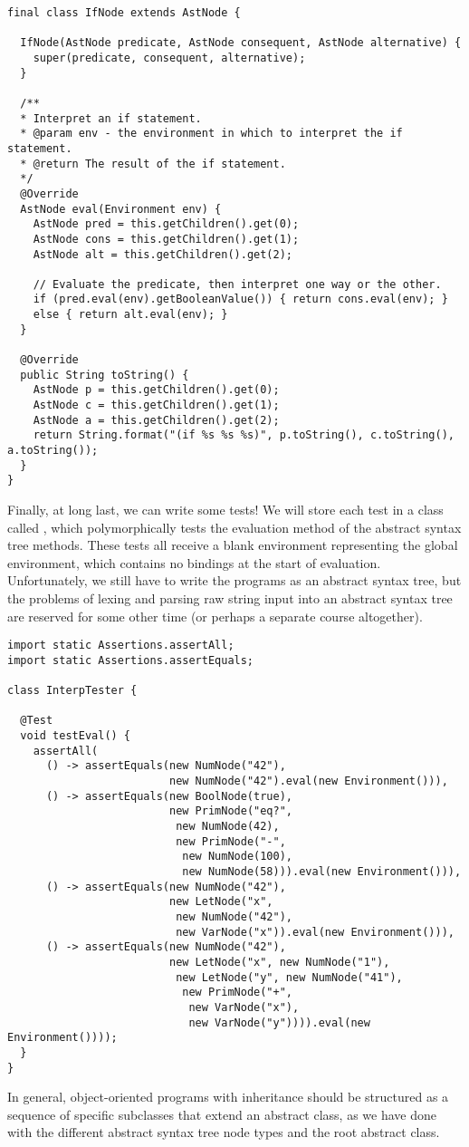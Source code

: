 \enlargethispage{-1\baselineskip}
\begin{lstlisting}[language=MyJava]
final class IfNode extends AstNode {
  
  IfNode(AstNode predicate, AstNode consequent, AstNode alternative) {
    super(predicate, consequent, alternative);
  }

  /**
  * Interpret an if statement.
  * @param env - the environment in which to interpret the if statement.
  * @return The result of the if statement.
  */
  @Override
  AstNode eval(Environment env) {
    AstNode pred = this.getChildren().get(0);
    AstNode cons = this.getChildren().get(1);
    AstNode alt = this.getChildren().get(2);

    // Evaluate the predicate, then interpret one way or the other.
    if (pred.eval(env).getBooleanValue()) { return cons.eval(env); } 
    else { return alt.eval(env); }
  }
  
  @Override
  public String toString() {
    AstNode p = this.getChildren().get(0);
    AstNode c = this.getChildren().get(1);
    AstNode a = this.getChildren().get(2);
    return String.format("(if %s %s %s)", p.toString(), c.toString(), a.toString());
  }
}
\end{lstlisting}

Finally, at long last, we can write some tests! We will store each test in a class called , which polymorphically tests the evaluation method of the abstract syntax tree methods. These tests all receive a blank environment representing the global environment, which contains no bindings at the start of evaluation. Unfortunately, we still have to write the programs as an abstract syntax tree, but the problems of lexing and parsing raw string input into an abstract syntax tree are reserved for some other time (or perhaps a separate course altogether).

\enlargethispage{3\baselineskip}
\begin{lstlisting}[language=MyJava]
import static Assertions.assertAll;
import static Assertions.assertEquals;
  
class InterpTester {
  
  @Test
  void testEval() {
    assertAll(
      () -> assertEquals(new NumNode("42"),
                         new NumNode("42").eval(new Environment())),
      () -> assertEquals(new BoolNode(true),
                         new PrimNode("eq?",
                          new NumNode(42),
                          new PrimNode("-",
                           new NumNode(100),
                           new NumNode(58))).eval(new Environment())),
      () -> assertEquals(new NumNode("42"),
                         new LetNode("x", 
                          new NumNode("42"), 
                          new VarNode("x")).eval(new Environment())),
      () -> assertEquals(new NumNode("42"),
                         new LetNode("x", new NumNode("1"),
                          new LetNode("y", new NumNode("41"),
                           new PrimNode("+", 
                            new VarNode("x"), 
                            new VarNode("y")))).eval(new Environment())));
  }
}
\end{lstlisting}

In general, object-oriented programs with inheritance should be structured as a sequence of specific subclasses that extend an abstract class, as we have done with the different abstract syntax tree node types and the root  abstract class. 

